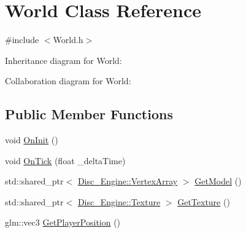 \hypertarget{class_world}{}\section{World Class Reference}
\label{class_world}


{\ttfamily \#include $<$World.\+h$>$}



Inheritance diagram for World\+:


Collaboration diagram for World\+:
\subsection*{Public Member Functions}
\begin{DoxyCompactItemize}
\item 
void \mbox{\hyperlink{class_world_a44b69f8225145de782c9ace28fed6819}{On\+Init}} ()
\item 
void \mbox{\hyperlink{class_world_a0bbbfa3065f37588fa83f7d5533bcd5b}{On\+Tick}} (float \+\_\+delta\+Time)
\item 
std\+::shared\+\_\+ptr$<$ \mbox{\hyperlink{class_disc___engine_1_1_vertex_array}{Disc\+\_\+\+Engine\+::\+Vertex\+Array}} $>$ \mbox{\hyperlink{class_world_ae19fd1fd5943772a8e0e95cc8a90fef8}{Get\+Model}} ()
\item 
std\+::shared\+\_\+ptr$<$ \mbox{\hyperlink{class_disc___engine_1_1_texture}{Disc\+\_\+\+Engine\+::\+Texture}} $>$ \mbox{\hyperlink{class_world_a0bf00237a38156d4c05d51211302328e}{Get\+Texture}} ()
\item 
glm\+::vec3 \mbox{\hyperlink{class_world_aa126fb6fe32add15eb789d7920659bb3}{Get\+Player\+Position}} ()
\end{DoxyCompactItemize}
